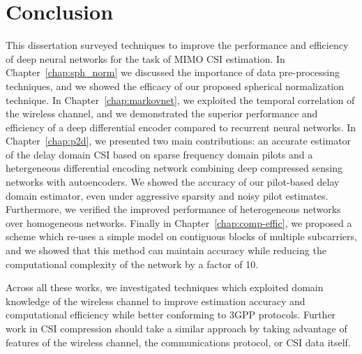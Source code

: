 \chapter{Conclusion} \label{chap:conclusion}

This dissertation surveyed techniques to improve the performance and efficiency of deep neural networks for the task of MIMO CSI estimation. In Chapter~\ref{chap:sph_norm} we discussed the importance of data pre-processing techniques, and we showed the efficacy of our proposed spherical normalization technique. In Chapter~\ref{chap:markovnet}, we exploited the temporal correlation of the wireless channel, and we demonstrated the superior performance and efficiency of a deep differential encoder compared to recurrent neural networks. In Chapter~\ref{chap:p2d}, we presented two main contributions: an accurate estimator of the delay domain CSI based on sparse frequency domain pilots and a hetergeneous differential encoding network combining deep compressed sensing networks with autoencoders. We showed the accuracy of our pilot-based delay domain estimator, even under aggressive sparsity and noisy pilot estimates. Furthermore, we verified the improved performance of heterogeneous networks over homogeneous networks. Finally in Chapter~\ref{chap:comp-effic}, we proposed a scheme which re-uses a simple model on contiguous blocks of multiple subcarriers, and we showed that this method can maintain accuracy while reducing the computational complexity of the network by a factor of 10.  

Across all these works, we investigated techniques which exploited domain knowledge of the wireless channel to improve estimation accuracy and computational efficiency while better conforming to 3GPP protocols. Further work in CSI compression should take a similar approach by taking advantage of features of the wireless channel, the communications protocol, or CSI data itself.